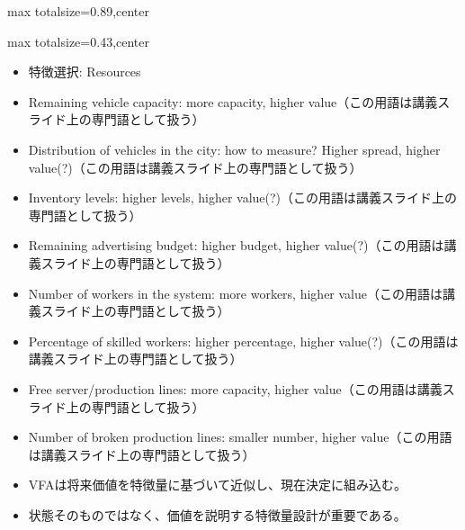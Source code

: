 \begin{minipage}[t]{0.58\textwidth}
\begin{adjustbox}{max totalsize={\textwidth}{0.89\textheight},center}
\begin{minipage}{\textwidth}
\end{minipage}
\end{adjustbox}
\end{minipage}


\clearpage
{}
\begin{minipage}[t]{0.405\textwidth}
\begin{adjustbox}{max totalsize={\textwidth}{0.43\textheight},center}
\begin{minipage}{\textwidth}\scriptsize
{}\begin{itemize}
\item 特徴選択: Resources
\item Remaining vehicle capacity: more capacity, higher value（この用語は講義スライド上の専門語として扱う）
\item Distribution of vehicles in the city: how to measure? Higher spread, higher value(?)（この用語は講義スライド上の専門語として扱う）
\item Inventory levels: higher levels, higher value(?)（この用語は講義スライド上の専門語として扱う）
\item Remaining advertising budget: higher budget, higher value(?)（この用語は講義スライド上の専門語として扱う）
\item Number of workers in the system: more workers, higher value（この用語は講義スライド上の専門語として扱う）
\item Percentage of skilled workers: higher percentage, higher value(?)（この用語は講義スライド上の専門語として扱う）
\item Free server/production lines: more capacity, higher value（この用語は講義スライド上の専門語として扱う）
\item Number of broken production lines: smaller number, higher value（この用語は講義スライド上の専門語として扱う）
\end{itemize}\begin{itemize}
\item VFAは将来価値を特徴量に基づいて近似し、現在決定に組み込む。
\item 状態そのものではなく、価値を説明する特徴量設計が重要である。
\end{itemize}
\end{minipage}
\end{adjustbox}
\end{minipage}\hfill
